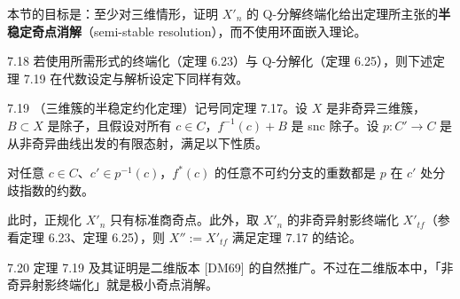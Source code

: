 本节的目标是：至少对三维情形，证明 $X'_n$ 的 Q-分解终端化给出定理所主张的\textbf{半稳定奇点消解}（semi-stable resolution），而不使用环面嵌入理论。

\begin{remark}{7.18}
若使用所需形式的终端化（定理 6.23）与 Q-分解化（定理 6.25），则下述定理 7.19 在代数设定与解析设定下同样有效。
\end{remark}

\begin{theorem*}{7.19}
（三维簇的半稳定约化定理）记号同定理 7.17。设 $X$ 是非奇异三维簇，$B\subset X$ 是除子，且假设对所有 $c\in C$，$f^{-1}(c)+B$ 是 snc 除子。设 $p\colon C'\to C$ 是从非奇异曲线出发的有限态射，满足以下性质。

对任意 $c\in C$、$c'\in p^{-1}(c)$，$f^*(c)$ 的任意不可约分支的重数都是 $p$ 在 $c'$ 处分歧指数的约数。

此时，正规化 $X'_n$ 只有标准商奇点。此外，取 $X'_n$ 的非奇异射影终端化 $X'_{tf}$（参看定理 6.23、定理 6.25），则 $X'':=X'_{tf}$ 满足定理 7.17 的结论。
\end{theorem*}


\begin{remark}{7.20}
定理 7.19 及其证明是二维版本 [DM69] 的自然推广。不过在二维版本中，「非奇异射影终端化」就是极小奇点消解。
\end{remark}
